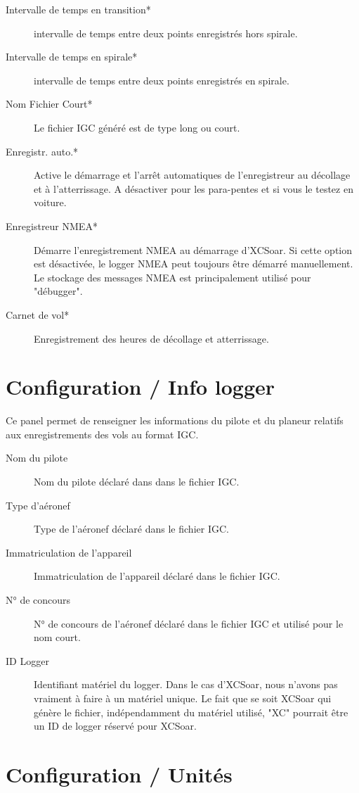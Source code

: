 \begin{description}
\item[Intervalle de temps en transition*]  intervalle de temps entre deux points enregistrés hors spirale.
\item[Intervalle de temps en spirale*]  intervalle de temps entre deux points enregistrés en spirale.
\item[Nom Fichier Court*]  Le fichier IGC généré est de type long ou court.
\item[Enregistr. auto.*]  Active le démarrage et l'arrêt automatiques de l'enregistreur au décollage et à l'atterrissage. A désactiver pour les para-pentes et si vous le testez en voiture.
\item[Enregistreur NMEA*]  Démarre l'enregistrement NMEA au démarrage d'XCSoar. Si cette option est désactivée, le logger NMEA peut toujours être démarré manuellement. Le stockage des messages NMEA est principalement utilisé pour "débugger". 
\item[Carnet de vol*]  Enregistrement des heures de décollage et atterrissage.
\end{description}

\section{Configuration / Info logger} \label{conf:loggerInfo}
Ce panel permet de renseigner les informations du pilote et du planeur relatifs aux enregistrements des vols au format IGC. 

\begin{description}
\item[Nom du pilote]  Nom du pilote déclaré dans dans le fichier IGC.
\item[Type d'aéronef]  Type de l'aéronef déclaré dans le fichier IGC.
\item[Immatriculation de l'appareil]  Immatriculation de l'appareil déclaré dans le fichier IGC.
\item[N° de concours]  N° de concours  de l'aéronef déclaré dans le fichier IGC et utilisé pour le nom court.
\item[ID Logger]  Identifiant matériel du logger. Dans le cas d'XCSoar, nous n'avons pas vraiment à faire à un matériel unique. Le fait que se soit XCSoar qui génère le fichier, indépendamment du matériel utilisé, "XC" pourrait être un ID de logger réservé pour XCSoar.
\end{description}

\section{Configuration / Unités}

